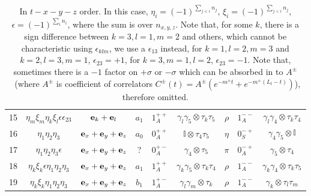\begin{table}
\begin{center}
\begin{tabular}{c|c|c|ccc|ccc}
15 & $\eta _m\xi _m\eta _k\xi _l\epsilon\epsilon_{23}$ & ${\bf e}_k+{\bf e}_l$     & $a_1$    & $1^{++}_A$ & $\gamma _l\gamma _5\otimes \tau _k \tau _5$  & $\rho$   & $1^{--}_A$ & $\gamma _l\gamma _4\otimes \tau _k\tau _4$ \\
\textcolor[rgb]{1,0,0}{16}
   & $\eta _1\eta _2\eta _3$                     & ${\bf e}_x+{\bf e}_y+{\bf e}_z$ & $a_0$    & $0^{++}_A$ & $\mathbb{I}\otimes \tau _4\tau _5$           & $\eta$  & $0^{-+}_S$ & $\gamma _4\gamma _5\otimes \mathbb{I}$       \\
\textcolor[rgb]{1,0,0}{17}
   & $\eta _1\eta _2\eta _3\epsilon$             & ${\bf e}_x+{\bf e}_y+{\bf e}_z$ & ?        & $0^{+-}_A$ & $\gamma _4\otimes \tau _5$                   & $\pi$    & $0^{-+}_A$ & $\gamma _5\otimes \tau _4$                   \\
\textcolor[rgb]{1,0,0}{18} 
   & $\eta_k\xi_k\epsilon\eta _1\eta _2\eta _3$  & ${\bf e}_x+{\bf e}_y+{\bf e}_z$ & $a_1$    & $1^{++}_A$ & $\gamma _k\gamma _5\otimes \tau _k\tau _4$   & $\rho$   & $1^{--}_A$ & $\gamma _k\gamma _4\otimes \tau _k\tau _5$   \\
\textcolor[rgb]{1,0,0}{19} 
   & $\eta_k\xi_k\eta _1\eta _2\eta _3$          & ${\bf e}_x+{\bf e}_y+{\bf e}_z$ & $b_1$    & $1^{+-}_A$ & $\gamma _l\gamma _m\otimes \tau _k$          & $\rho$ & $1^{--}_A$ & $\gamma_k\otimes\tau_l\tau_m$        \\
\hline
\end{tabular}
\end{center}
\caption{\label{tab:staggeredMesontxyz}In $t-x-y-z$ order. In this case, $\eta_i=(-1)^{\sum _{j<i}n_j}$, $\xi_i=(-1)^{\sum _{j<i}n_j}$, $\epsilon=(-1)^{\sum _{i}n_i}$, where the sum is over $n_{x,y,z}$.
Note that, for some $k$, there is a sign difference between $k=3,l=1,m=2$ and others, which cannot be characteristic using $\epsilon _{klm}$, we use a $\epsilon _{13}$ instead, for $k=1,l=2,m=3$ and $k=2,l=3,m=1$, $\epsilon _{23}=+1$, for $k=3,m=1,l=2$, $\epsilon _{23}=-1$. Note that, sometimes there is a $-1$ factor on $+\sigma$ or $-\sigma$ which can be absorbed in to $A^{\pm}$~(where $A^{\pm}$ is coefficient of correlators $C^{\pm}(t)=A^{\pm}\left(e^{-m^{\pm}t}+e^{-m^{\pm}(L_t-t)}\right)$), therefore omitted.}
\end{table}

